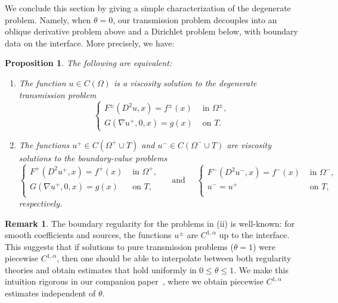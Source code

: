 \documentclass[letter,11pt]{amsart}
\newtheorem{prop}[thm]{Proposition}
\theoremstyle{definition}
\newtheorem{rem}[thm]{Remark}
\numberwithin{equation}{section}
\begin{document}
\medskip

We conclude this section by giving a simple characterization of the degenerate problem.
Namely, when $\theta = 0$, our transmission problem decouples into an oblique derivative problem above and a Dirichlet problem below, with boundary data on the interface.
More precisely, we have:

\medskip

\begin{prop}
\label{prop:deg}
The following are equivalent:
\begin{enumerate}[label=\rm(\roman*)]
\item The function $u \in C(\Omega)$ is a viscosity solution to the degenerate transmission problem
\[
\begin{cases}
F^{\pm}(D^2 u, x) = f^{\pm}(x) & \text{ in } \Omega^{\pm},\\
G(\nabla u^{+}, 0, x) = g(x) & \text{ on } T.
\end{cases}
\]
\item The functions $u^{+} \in C(\Omega^{+}\cup T)$ and $u^{-} \in C(\Omega^{-}\cup T)$ are viscosity solutions to the boundary-value problems
\[
\begin{cases}
F^{+}(D^2 u^{+}, x) = f^{+}(x) & \text{ in } \Omega^{+},\\
G(\nabla u^{+},0, x) = g(x) & \text{ on } T,\\
\end{cases}
\quad \text{ and } \quad 
\begin{cases}
F^{-}(D^2 u^{-}, x) = f^{-}(x) & \text{ in } \Omega^{-},\\
u^{-} = u^{+} & \text{ on } T,\\
\end{cases}
\]
respectively.
\end{enumerate}
\end{prop}
\begin{rem}
\label{rem:intuition}
The boundary regularity for the problems in (ii) is well-known: for smooth coefficients and sources, the functions $u^{\pm}$ are $C^{1,\alpha}$ up to the interface.
This suggests that if solutions to pure transmission problems ($\theta = 1$) were piecewise $C^{1,\alpha}$, then one should be able to interpolate between both regularity theories and obtain estimates that hold uniformly in $0 \leq \theta \leq 1$. 
We make this intuition rigorous in our companion paper~\cite{E}, where we obtain piecewise $C^{1,\alpha}$ estimates independent of $\theta$.
\end{rem}
\end{document}
